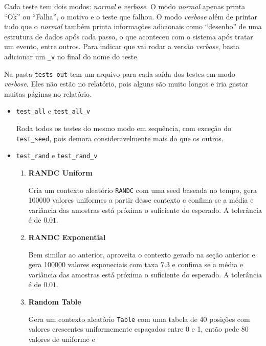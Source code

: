 \documentclass[a4paper]{article}
\newcommand{\arq}{\texttt}
\newcommand{\inlcode}{\texttt}
\begin{document}
Cada teste tem dois modos:
\emph{normal} e \emph{verbose}.
O modo \emph{normal} apenas printa
``Ok'' ou ``Falha'', o motivo e o teste que falhou.
O modo \emph{verbose} além de printar tudo que o \emph{normal}
também printa informações adicionais
como ``desenho'' de uma estrutura de dados após cada passo,
o que aconteceu com o sistema após tratar um evento, entre outros.
Para indicar que vai rodar a versão \emph{verbose},
basta adicionar um \inlcode{\_v} no final do nome do teste.

Na pasta \arq{tests-out} tem um arquivo
para cada saída dos testes
em modo \emph{verbose}.
Eles não estão no relatório,
pois alguns são muito longos
e iria gastar muitas páginas no relatório.

\begin{itemize}
    \item \inlcode{test\_all} e \inlcode{test\_all\_v} \par
        Roda todos os testes do mesmo modo em sequência,
        com exceção do \inlcode{test\_seed},
        pois demora consideravelmente mais do que os outros.
    \item \inlcode{test\_rand} e \inlcode{test\_rand\_v} \par
        \begin{enumerate}
            \item \textbf{RANDC Uniform} \par
                Cria um contexto aleatório \inlcode{RANDC}
                com uma seed baseada no tempo,
                gera 100000 valores uniformes
                a partir desse contexto
                e confima se a média e variância das amostras
                está próxima o suficiente do esperado.
                A tolerância é de \(0.01\).
            \item \textbf{RANDC Exponential} \par
                Bem similar ao anterior,
                aproveita o contexto gerado na seção anterior
                e gera 100000 valores exponeciais com taxa \(7.3\)
                e confima se a média e variância das amostras
                está próxima o suficiente do esperado.
                A tolerância é de \(0.01\).
            \item \textbf{Random Table} \par
                Gera um contexto aleatório \inlcode{Table}
                com uma tabela de 40 posições com valores
                crescentes uniformemente espaçados entre 0 e 1,
                então pede 80 valores de uniforme e

\end{enumerate}
\end{itemize}
\end{document}
